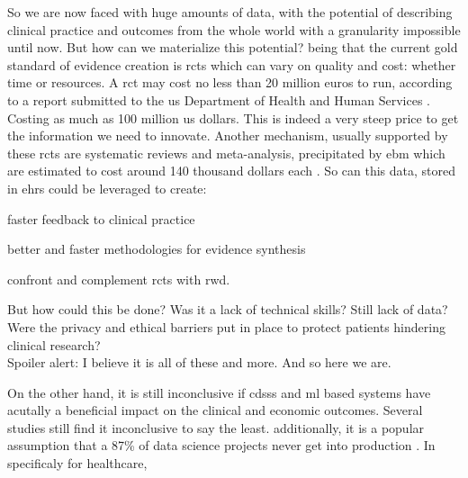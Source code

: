 So we are now faced with huge amounts of data, with the potential of describing clinical practice and outcomes from the whole world with a granularity impossible until now. But how can we materialize this potential?
being that the current gold standard of evidence creation is \acp{rct} which can vary on quality and cost: whether time or resources. A \ac{rct} may cost no less than 20 million euros to run, according to a report submitted to the \ac{us} Department of Health and Human Services \cite{sertkayaaylinEXAMINATIONCLINICALTRIAL2014}. Costing as much as 100 million \ac{us} dollars. This is indeed a very steep price to get the information we need to innovate.
Another mechanism, usually supported by these \acp{rct} are systematic reviews and meta-analysis, precipitated by \ac{ebm} which are estimated to cost around 140 thousand dollars each \cite{michelsonSignificantCostSystematic2019}.
So can this data, stored in \acp{ehr} could be leveraged to create:
\begin{myitemize}
    \item faster feedback to clinical practice
    \item better and faster methodologies for evidence synthesis
    \item confront and complement \acp{rct} with \ac{rwd}.
\end{myitemize}
But how could this be done? Was it a lack of technical skills? Still lack of data? Were the privacy and ethical barriers put in place to protect patients hindering clinical research? \\
Spoiler alert: I believe it is all of these and more. And so here we are.







On the other hand, it is still inconclusive if \acp{cdss} and \ac{ml} based systems have acutally a beneficial impact on the clinical and economic outcomes. Several studies still find it inconclusive \cite{muhiyaddinImpactClinicalDecision2020,kilsdonkFactorsInfluencingImplementation2017,muhiyaddinImpactClinicalDecision2020} to say the least.
additionally, it is a popular assumption that a 87\% of data science projects never get into production \cite{Why87Data2019}. In specificaly for healthcare, 


